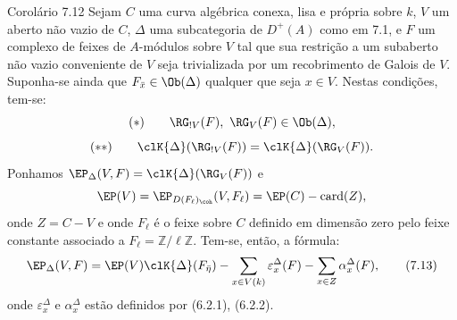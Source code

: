 \begin{statement}{Corolário 7.12}
Sejam $C$ uma curva algébrica conexa, lisa e própria sobre $k$, $V$ um aberto não vazio de $C$, $\Delta$ uma subcategoria de $D^+(A)$ como em 7.1, e $F$ um complexo de feixes de $A$-módulos sobre $V$ tal que sua restrição a um subaberto não vazio conveniente de $V$ seja trivializada por um recobrimento de Galois de $V$. Suponha-se ainda que $F_{\bar x}\in\Ob(\Delta)$ qualquer que seja $x\in V$. Nestas condições, tem-se:
\[
(*)\qquad \RG_{!V}(F),\ \RG_V(F)\in\Ob(\Delta),
\]
\[
(**)\qquad
\clK{\Delta}(\RG_{!V}(F))=\clK{\Delta}(\RG_V(F)).
\]
Ponhamos $\EP_\Delta(V,F)=\clK{\Delta}(\RG_V(F))$ e
\[
\EP(V)=\EP_{D(F_\ell)_{\coh}}(V,F_\ell)=\EP(C)-\operatorname{card}(Z),
\]
onde $Z=C-V$ e onde $F_\ell$ é o feixe sobre $C$ definido em dimensão zero pelo feixe constante associado a $F_\ell=\mathbb Z/\ell\mathbb Z$. Tem-se, então, a fórmula:
\[
\EP_\Delta(V,F)
=
\EP(V)\clK{\Delta}(F_{\bar\eta})
-\sum_{x\in V(k)}\varepsilon_x^\Delta(F)
-\sum_{x\in Z}\alpha_x^\Delta(F),
\tag{7.13}
\]
onde $\varepsilon_x^\Delta$ e $\alpha_x^\Delta$ estão definidos por (6.2.1), (6.2.2).
\end{statement}

